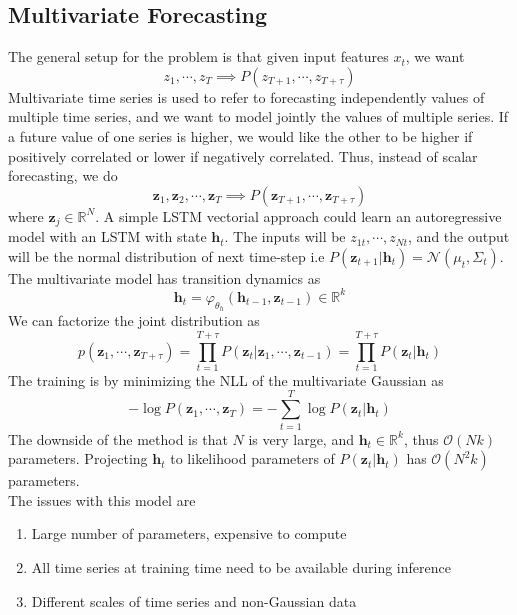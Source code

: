 \subsection{Multivariate Forecasting}
The general setup for the problem is that given input features $x_t$, we want 
\begin{equation}
	z_{1}, \cdots, z_T \implies P(z_{T+1}, \cdots, z_{T+\tau})
\end{equation}
Multivariate time series is used to refer to forecasting independently values of multiple time series, and we want to model jointly the values of multiple series. If a future value of one series is higher, we would like the other to be higher if positively correlated or lower if negatively correlated. Thus, instead of scalar forecasting, we do
\begin{equation}
	\mathbf{z}_1, \mathbf{z}_2, \cdots, \mathbf{z}_T \implies P(\mathbf{z}_{T+1}, \cdots, \mathbf{z}_{T+\tau})
\end{equation}
where $\mathbf{z}_j \in \mathbb{R}^N$. A simple LSTM vectorial approach could learn an autoregressive model with an LSTM with state $\mathbf{h}_t$. The inputs will be $z_{1t}, \cdots, z_{Nt}$, and the output will be the normal distribution of next time-step i.e $P(\mathbf z_{t+1} | \mathbf{h}_t) = \mathcal{N}(\mu_t, \Sigma_t)$. The multivariate model has transition dynamics as
\begin{equation}
	\mathbf{h}_t = \varphi_{\theta_h}(\mathbf{h}_{t-1}, \mathbf{z}_{t-1}) \in \mathbb{R}^k
\end{equation}
We can factorize the joint distribution as
\begin{equation}
	p(\mathbf{z}_1, \cdots, \mathbf{z}_{T+\tau}) = \prod_{t=1}^{T+\tau} P(\mathbf{z}_t|\mathbf{z}_1, \cdots, \mathbf{z}_{t-1}) = \prod_{t=1}^{T+\tau}P(\mathbf{z}_t | \mathbf{h}_t)
\end{equation}
The training is by minimizing the NLL of the multivariate Gaussian as
\begin{equation}
	-\log P(\mathbf{z}_1, \cdots, \mathbf{z}_T) = -\sum_{t=1}^T \log P(\mathbf z_t | \mathbf h_t)
\end{equation}
The downside of the method is that $N$ is very large, and $\mathbf{h}_t \in \mathbb{R}^k$, thus $\mathcal{O}(Nk)$ parameters. Projecting $\mathbf{h}_t$ to likelihood parameters of $P(\mathbf z_t | \mathbf h_t)$ has $\mathcal{O}(N^2k)$ parameters. \\
The issues with this model are
\begin{enumerate}
	\item Large number of parameters, expensive to compute
	\item All time series at training time need to be available during inference
	\item Different scales of time series and non-Gaussian data
\end{enumerate}
